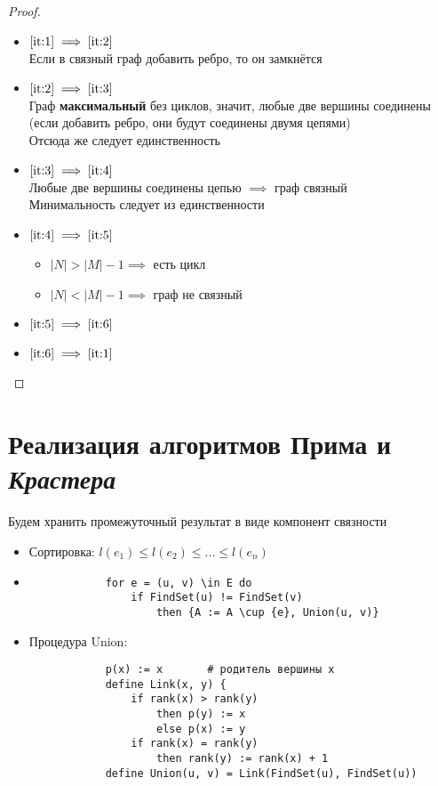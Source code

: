 \begin{proof}
	\hfill
    \begin{itemize}
        \item $ \ref{it:1} \implies \ref{it:2} $ \\
        Если в связный граф добавить ребро, то он замкнётся
        \item $ \ref{it:2} \implies \ref{it:3} $ \\
        Граф \textbf{максимальный} без циклов, значит, любые две вершины соединены (если добавить ребро, они будут соединены двумя цепями) \\
        Отсюда же следует единственность
        \item $ \ref{it:3} \implies \ref{it:4} $ \\
        Любые две вершины соединены цепью $ \implies $ граф связный \\
        Минимальность следует из единственности
        \item $ \ref{it:4} \implies \ref{it:5} $ \\
        \begin{itemize}
        	\item $ |N| > |M| - 1 \implies $ есть цикл
            \item $ |N| < |M| - 1 \implies $ граф не связный
        \end{itemize}
        \item $ \ref{it:5} \implies \ref{it:6} $
        \item $ \ref{it:6} \implies \ref{it:1} $
    \end{itemize}
\end{proof}

\section{Реализация алгоритмов Прима и \textit{Крастера}}

\begin{algorithm}
    Будем хранить промежуточный результат в виде компонент связности
    \hfill
    \begin{itemize}
    	\item Сортировка: $ l(e_1) \le l(e_2) \le ... \le l(e_n) $
        \item
        \begin{verbatim}
        	for e = (u, v) \in E do
                if FindSet(u) != FindSet(v)
                    then {A := A \cup {e}, Union(u, v)}
        \end{verbatim}
        \item Процедура Union:
        \begin{verbatim}
        	p(x) := x       # родитель вершины x
            define Link(x, y) {
                if rank(x) > rank(y)
                    then p(y) := x
                    else p(x) := y
                if rank(x) = rank(y)
                    then rank(y) := rank(x) + 1
            define Union(u, v) = Link(FindSet(u), FindSet(u))
        \end{verbatim}
    \end{itemize}

\end{algorithm}
